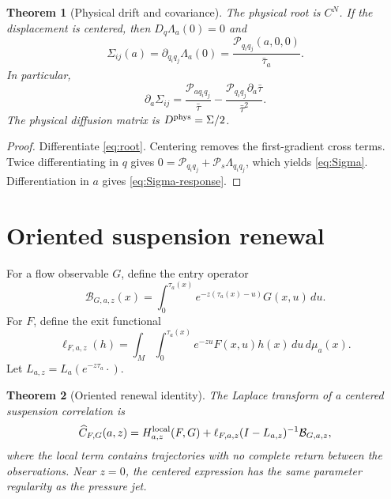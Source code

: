 \documentclass[11pt,reqno]{amsart}
\newtheorem{theorem}{Theorem}[section]
\theoremstyle{definition}
\theoremstyle{remark}
\begin{document}
\begin{theorem}[Physical drift and covariance]\label{thm:physical}
The physical root is $C^N$.  If the displacement is centered, then
$D_q\Lambda_a(0)=0$ and
\begin{equation}\label{eq:Sigma}
 \Sigma_{ij}(a)=\partial_{q_iq_j}\Lambda_a(0)
 =\frac{\mathscr P_{q_iq_j}(a,0,0)}{\bar\tau_a}.
\end{equation}
In particular,
\begin{equation}\label{eq:Sigma-response}
 \partial_a\Sigma_{ij}
 =\frac{\mathscr P_{aq_iq_j}}{\bar\tau}
 -\frac{\mathscr P_{q_iq_j}\partial_a\bar\tau}{\bar\tau^2}.
\end{equation}
The physical diffusion matrix is $D^{\rm phys}=\Sigma/2$.
\end{theorem}

\begin{proof}
Differentiate \eqref{eq:root}.  Centering removes the first-gradient cross
terms.  Twice differentiating in $q$ gives
$0=\mathscr P_{q_iq_j}+\mathscr P_s\Lambda_{q_iq_j}$, which yields
\eqref{eq:Sigma}.  Differentiation in $a$ gives
\eqref{eq:Sigma-response}.
\end{proof}

\section{Oriented suspension renewal}

For a flow observable $G$, define the entry operator
\begin{equation}\label{eq:entry}
 \mathcal B_{G,a,z}(x)=
 \int_0^{\tau_a(x)}e^{-z(\tau_a(x)-u)}G(x,u)\,du.
\end{equation}
For $F$, define the exit functional
\begin{equation}\label{eq:exit}
 \ell_{F,a,z}(h)=
 \int_M\int_0^{\tau_a(x)}e^{-zu}F(x,u)h(x)\,du\,d\mu_a(x).
\end{equation}
Let $L_{a,z}=L_a(e^{-z\tau_a}\cdot)$.

\begin{theorem}[Oriented renewal identity]\label{thm:renewal}
The Laplace transform of a centered suspension correlation is
\begin{equation}\label{eq:renewal}
 \widehat C_{F,G}(a,z)=H_{a,z}^{\rm local}(F,G)
 +\ell_{F,a,z}(I-L_{a,z})^{-1}\mathcal B_{G,a,z},
\end{equation}
where the local term contains trajectories with no complete return between the
observations.  Near $z=0$, the centered expression has the same parameter
regularity as the pressure jet.
\end{theorem}
\end{document}
